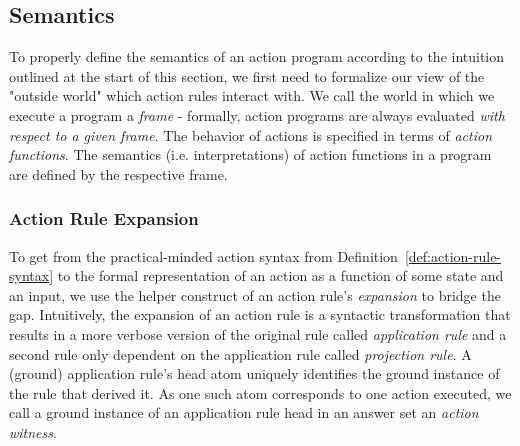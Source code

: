 \subsection{Semantics}
\label{subsec:evolog-actions-semantics}

To properly define the semantics of an action program according to the intuition outlined at the start of this section, we first need to formalize our view of the "outside world" which action rules interact with. We call the world in which we execute a program a \emph{frame} - formally, action programs are always evaluated \emph{with respect to a given frame}. The behavior of actions is specified in terms of \emph{action functions}. The semantics (i.e. interpretations) of action functions in a program are defined by the respective frame.

\subsubsection{Action Rule Expansion}
\label{subsubsec:evolog-actions-semantics-expansion}

To get from the practical-minded action syntax from Definition~\ref{def:action-rule-syntax} to the formal representation of an action as a function of some state and an input, we use the helper construct of an action rule's \emph{expansion} to bridge the gap. Intuitively, the expansion of an action rule is a syntactic transformation that results in a more verbose version of the original rule called \emph{application rule} and a second rule only dependent on the application rule called \emph{projection rule}. A (ground) application rule's head atom uniquely identifies the ground instance of the rule that derived it. As one such atom corresponds to one action executed, we call a ground instance of an application rule head in an answer set an \emph{action witness}. 

